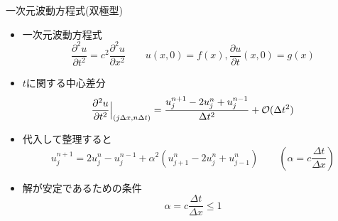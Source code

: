 \begin{frame}[t]{一次元波動方程式(双極型)}
  \begin{itemize}
  \item 一次元波動方程式
    \[
    \frac{\partial^2 u}{\partial t^2} = c^2 \frac{\partial^2 u}{\partial x^2} \qquad u(x,0)=f(x), \frac{\partial u}{\partial t} (x,0) = g(x)
    \]
  \item $t$に関する中心差分
    \[
    \frac{\partial^2 u}{\partial t^2} \Big|_{(j \Delta x, n \Delta t)} = \frac{u_{j}^{n+1} - 2 u_{j}^{n} + u_{j}^{n-1}}{\Delta t^2} + {\cal O}(\Delta t^2)
    \]
  \item 代入して整理すると
    \[
    u_{j}^{n+1} = 2u_{j}^{n} - u_{j}^{n-1} + \alpha^2 (u_{j+1}^{n} - 2 u_{j}^{n} + u_{j-1}^{n}) \qquad (\alpha = c\frac{\Delta t}{\Delta x})
    \]
  \item 解が安定であるための条件
    \[
    \alpha = c\frac{\Delta t}{\Delta x} \le 1
    \]
  \end{itemize}
\end{frame}
